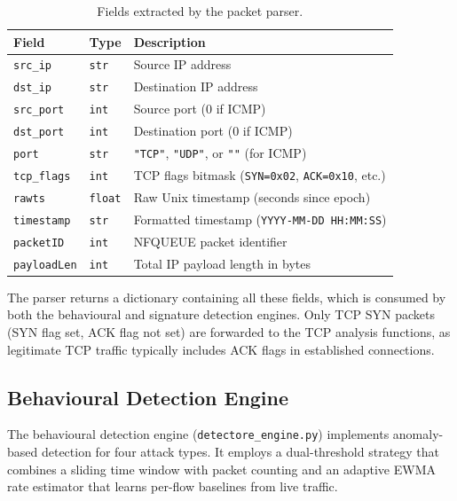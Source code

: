 \documentclass[12pt,a4paper]{article}
\begin{document}
\begin{table}[H]
\centering
\caption{Fields extracted by the packet parser.}
\label{tab:parsed_fields}
\begin{tabular}{llp{7cm}}
\toprule
\textbf{Field} & \textbf{Type} & \textbf{Description} \\
\midrule
\texttt{src\_ip}     & \texttt{str}   & Source IP address \\
\texttt{dst\_ip}     & \texttt{str}   & Destination IP address \\
\texttt{src\_port}   & \texttt{int}   & Source port (0 if ICMP) \\
\texttt{dst\_port}   & \texttt{int}   & Destination port (0 if ICMP) \\
\texttt{port}        & \texttt{str}   & \texttt{"TCP"}, \texttt{"UDP"}, or \texttt{""} (for ICMP) \\
\texttt{tcp\_flags}  & \texttt{int}   & TCP flags bitmask (\texttt{SYN=0x02}, \texttt{ACK=0x10}, etc.) \\
\texttt{rawts}       & \texttt{float} & Raw Unix timestamp (seconds since epoch) \\
\texttt{timestamp}   & \texttt{str}   & Formatted timestamp (\texttt{YYYY-MM-DD HH:MM:SS}) \\
\texttt{packetID}    & \texttt{int}   & NFQUEUE packet identifier \\
\texttt{payloadLen}  & \texttt{int}   & Total IP payload length in bytes \\
\bottomrule
\end{tabular}
\end{table}

The parser returns a dictionary containing all these fields, which is consumed by both the behavioural and signature detection engines. Only TCP SYN packets (SYN flag set, ACK flag not set) are forwarded to the TCP analysis functions, as legitimate TCP traffic typically includes ACK flags in established connections.

\subsection{Behavioural Detection Engine}
\label{sec:behaviour}

The behavioural detection engine (\texttt{detectore\_engine.py}) implements anomaly-based detection for four attack types. It employs a dual-threshold strategy that combines a sliding time window with packet counting and an adaptive EWMA rate estimator that learns per-flow baselines from live traffic.
\end{document}
